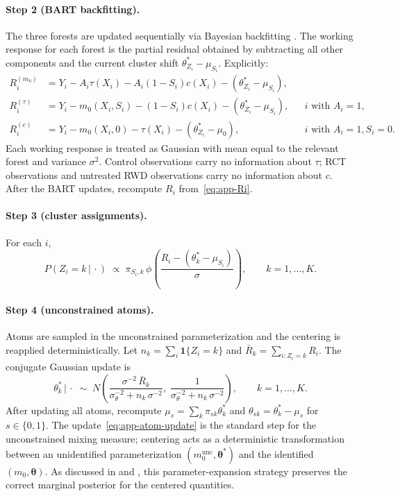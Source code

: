 \documentclass[11pt]{article}
\newcommand{\given}{\,|\,}
\begin{document}
\paragraph{Step 2 (BART backfitting).} The three forests are updated sequentially via Bayesian backfitting \citep{chipman2010bart}. The working response for each forest is the partial residual obtained by subtracting all other components and the current cluster shift $\theta_{Z_i}^* - \mu_{S_i}$. Explicitly:
\begin{align}
R_i^{(m_0)} &= Y_i - A_i \tau(X_i) - A_i(1-S_i) c(X_i) - (\theta_{Z_i}^* - \mu_{S_i}), \\
R_i^{(\tau)} &= Y_i - m_0(X_i, S_i) - (1-S_i) c(X_i) - (\theta_{Z_i}^* - \mu_{S_i}), && i \text{ with } A_i = 1, \\
R_i^{(c)} &= Y_i - m_0(X_i, 0) - \tau(X_i) - (\theta_{Z_i}^* - \mu_0), && i \text{ with } A_i = 1, S_i = 0.
\end{align}
Each working response is treated as Gaussian with mean equal to the relevant forest and variance $\sigma^2$. Control observations carry no information about $\tau$; RCT observations and untreated RWD observations carry no information about $c$. After the BART updates, recompute $R_i$ from~\eqref{eq:app-Ri}.

\paragraph{Step 3 (cluster assignments).} For each $i$,
\begin{equation}
P(Z_i = k \given \cdot) \;\propto\; \pi_{S_i, k}\, \phi\!\left(\frac{R_i - (\theta_k^* - \mu_{S_i})}{\sigma}\right), \qquad k = 1, \ldots, K.
\label{eq:app-cluster}
\end{equation}

\paragraph{Step 4 (unconstrained atoms).} Atoms are sampled in the unconstrained parameterization and the centering is reapplied deterministically. Let $n_k = \sum_i \mathbf{1}\{Z_i = k\}$ and $\bar R_k = \sum_{i: Z_i = k} R_i$. The conjugate Gaussian update is
\begin{equation}
\theta_k^* \given \cdot \;\sim\; N\!\left(\frac{\sigma^{-2}\, \bar R_k}{\sigma_\theta^{-2} + n_k\, \sigma^{-2}},\; \frac{1}{\sigma_\theta^{-2} + n_k\, \sigma^{-2}}\right), \qquad k = 1, \ldots, K.
\label{eq:app-atom-update}
\end{equation}
After updating all atoms, recompute $\mu_s = \sum_k \pi_{sk} \theta_k^*$ and $\theta_{sk} = \theta_k^* - \mu_s$ for $s \in \{0, 1\}$. The update~\eqref{eq:app-atom-update} is the standard step for the unconstrained mixing measure; centering acts as a deterministic transformation between an unidentified parameterization $(m_0^{\mathrm{unc}}, \bm{\theta}^*)$ and the identified $(m_0, \bm{\theta})$. As discussed in \citet{yang2010semiparametric} and \citet{henderson2020individualized}, this parameter-expansion strategy preserves the correct marginal posterior for the centered quantities.
\end{document}

